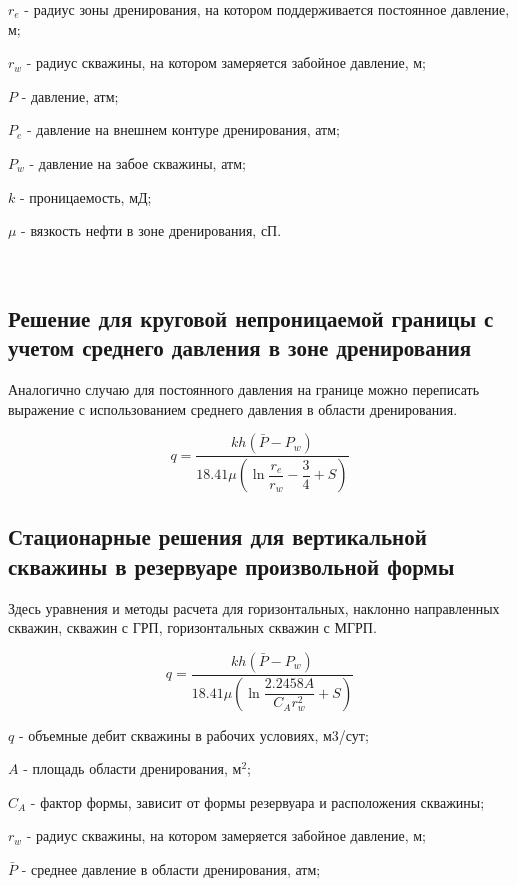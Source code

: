 $r_e$ -  радиус зоны дренирования, на котором поддерживается постоянное давление, м;

$r_w$ - радиус скважины, на котором замеряется забойное давление, м;

$P$ - давление, атм;

$P_e$ - давление на внешнем контуре дренирования, атм;

$P_w$ - давление на забое скважины, атм;

$k$ - проницаемость, мД;

$\mu$ - вязкость нефти в зоне дренирования, сП.

\

\subsection{Решение для круговой непроницаемой границы с учетом среднего давления в зоне дренирования}

Аналогично случаю для постоянного давления на границе можно переписать выражение с использованием среднего давления в области дренирования. 

$$q=\frac{kh\left( \bar{P}-P_w\right)}{ 18.41 \mu\left(\ln{\dfrac{r_e}{r_w}} - \dfrac{3}{4}+ S \right)}$$




\subsection{Стационарные решения для вертикальной скважины в резервуаре произвольной формы}

Здесь уравнения и методы расчета для горизонтальных, наклонно направленных скважин, скважин с ГРП, горизонтальных скважин с МГРП. 

\begin{equation}
	q=\frac{kh\left( \bar{P}-P_w\right)}{ 18.41 \mu\left(\ln{\dfrac{2.2458 A}{C_A r_w^2}} + S \right)}
\end{equation}

$q$ - объемные дебит скважины в рабочих условиях, м3/сут;

$A$ -  площадь области дренирования, м$^2$;

$C_A$ -  фактор формы, зависит от формы резервуара и расположения скважины;

$r_w$ - радиус скважины, на котором замеряется забойное давление, м;

$\bar{P}$ - среднее давление в области дренирования, атм;

